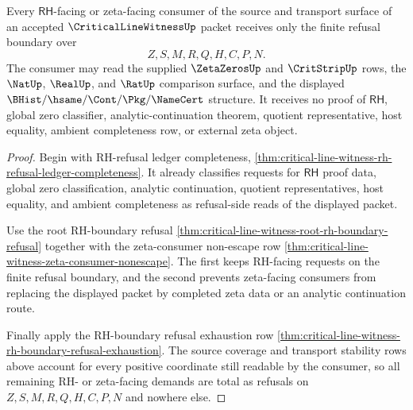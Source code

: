 \begin{theorem}
\label{thm:critical-line-witness-root-refusal-boundary-totality}
Every $\mathsf{RH}$-facing or zeta-facing consumer of the source and transport
surface of an accepted $\CriticalLineWitnessUp$ packet receives only the finite
refusal boundary over
$$
Z,S,M,R,Q,H,C,P,N.
$$
The consumer may read the supplied $\ZetaZerosUp$ and $\CritStripUp$ rows, the
$\NatUp$, $\RealUp$, and $\RatUp$ comparison surface, and the displayed
$\BHist/\hsame/\Cont/\Pkg/\NameCert$ structure. It receives no proof of
$\mathsf{RH}$, global zero classifier, analytic-continuation theorem, quotient
representative, host equality, ambient completeness row, or external zeta
object.
\end{theorem}
\begin{proof}
Begin with RH-refusal ledger completeness,
\autoref{thm:critical-line-witness-rh-refusal-ledger-completeness}. It already
classifies requests for $\mathsf{RH}$ proof data, global zero classification,
analytic continuation, quotient representatives, host equality, and ambient
completeness as refusal-side reads of the displayed packet.

Use the root RH-boundary refusal
\autoref{thm:critical-line-witness-root-rh-boundary-refusal} together with the
zeta-consumer non-escape row
\autoref{thm:critical-line-witness-zeta-consumer-nonescape}. The first keeps
RH-facing requests on the finite refusal boundary, and the second prevents
zeta-facing consumers from replacing the displayed packet by completed zeta
data or an analytic continuation route.

Finally apply the RH-boundary refusal exhaustion row
\autoref{thm:critical-line-witness-rh-boundary-refusal-exhaustion}. The source
coverage and transport stability rows above account for every positive
coordinate still readable by the consumer, so all remaining RH- or zeta-facing
demands are total as refusals on $Z,S,M,R,Q,H,C,P,N$ and nowhere else.
\end{proof}

